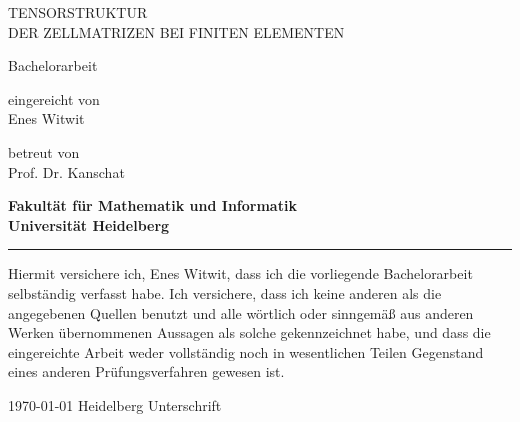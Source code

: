 \documentclass[12pt,a4paper]{scrartcl}
\numberwithin{equation}{section}
\begin{document}
\pagestyle{empty}
\setcounter{tocdepth}{2}




\begin{titlepage}

\vspace*{0.5cm} 
\begin{center} 


{\huge{ 

TENSORSTRUKTUR \\ DER ZELLMATRIZEN BEI FINITEN ELEMENTEN
}}
\vspace*{4cm}

{\Large Bachelorarbeit}
\vspace*{1cm}


eingereicht von \\[0.5cm]

{\Large Enes Witwit}
\vspace*{1cm}

betreut von  \\[0.5cm]
{\Large Prof. Dr. Kanschat}
\vspace*{5cm}

\textbf{
Fakultät für Mathematik und Informatik\\[0.3cm]
Universität Heidelberg}
\end{center}
\end{titlepage}


\newpage\phantom{Leer}
\thispagestyle{empty}
\newpage
\thispagestyle{empty}
\vspace*{14cm}

\noindent\rule{16cm}{0.4pt}

Hiermit versichere ich, Enes Witwit, dass ich die vorliegende Bachelorarbeit selbständig
verfasst habe.
Ich versichere, dass ich keine anderen als die angegebenen Quellen benutzt und
alle wörtlich oder sinngemäß aus anderen Werken übernommenen Aussagen als
solche gekennzeichnet habe, und dass die eingereichte Arbeit weder vollständig
noch in wesentlichen Teilen Gegenstand eines anderen Prüfungsverfahren
gewesen ist. \\[2ex] 

\noindent


\today \hspace*{1cm}  Heidelberg \hspace*{5cm} Unterschrift\\[5ex]
\end{document}
